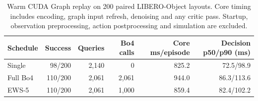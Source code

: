 \begin{table}[tb]
\centering\small
\caption{Warm CUDA Graph replay on 200 paired LIBERO-Object layouts. Core timing includes encoding, graph input refresh, denoising and any critic pass. Startup, observation preprocessing, action postprocessing and simulation are excluded.}
\label{tab:graph-rollout}
\begin{tabular}{@{}lrrrrr@{}}
\toprule
Schedule & Success & Queries & Bo4 calls & Core ms/episode & Decision p50/p90 (ms) \\
\midrule
Single & 98/200 & 2,140 & 0 & 825.2 & 72.5/98.9 \\
Full Bo4 & 110/200 & 2,061 & 2,061 & 944.0 & 86.3/113.6 \\
EWS-5 & 110/200 & 2,061 & 1,000 & 859.4 & 82.4/102.2 \\
\bottomrule
\end{tabular}
\end{table}
